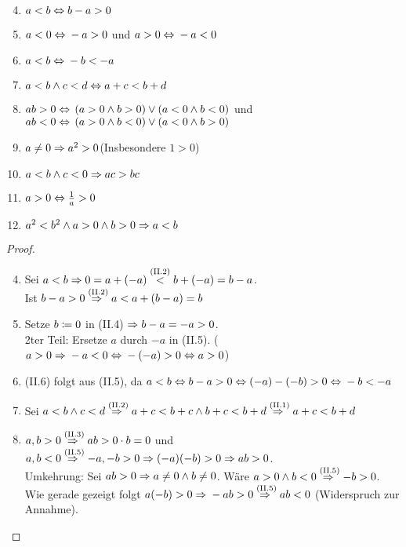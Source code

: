 
\begin{satz}
    \theoremescape
    \begin{enumerate}[label=(II.\arabic*)]
        \setcounter{enumi}{3}
        \item $a<b\equivalent b-a > 0$
        \item $a<0\equivalent -a > 0$ und $a>0\equivalent -a < 0$
        \item $a<b\equivalent -b < -a$
        \item $a<b \land c < d \equivalent a+c<b+d$
        \item $ab > 0 \equivalent \pair{a>0 \land b > 0}\lor\pair{a < 0 \land b < 0}$ und $ab < 0 \equivalent \pair{a>0 \land b < 0}\lor\pair{a < 0 \land b > 0}$
        \item $a\neq 0 \impl a^2 > 0$\quad(Insbesondere $1>0$)
        \item $a<b \land c<0 \impl ac > bc$
        \item $a>0 \equivalent \frac{1}{a}>0$
        \item $a^2 < b^2 \land a > 0 \land b > 0 \impl a < b$
    \end{enumerate}
    \newpage
    \begin{proof}
        \theoremescape
        \begin{enumerate}[label=(II.\arabic*)]
            \setcounter{enumi}{3}
            \item Sei $a<b \impl 0=a+(-a) \annot{<}{(II.2)} b + (-a) = b-a$.\\
            Ist $b-a>0 \annot{\impl}{(II.2)} a<a+(b-a)=b$
            \item Setze $b\definedas 0$ in (II.4) $\impl b-a=-a>0$.\\
            2ter Teil: Ersetze $a$ durch $-a$ in (II.5). ($a>0 \impl -a < 0 \equivalent -(-a)>0 \equivalent a >0$)
            \item (II.6) folgt aus (II.5), da $a<b\equivalent b-a>0 \equivalent (-a)-(-b) > 0\equivalent -b < -a$
            \item Sei $a<b \land c < d \annot{\impl}{(II.2)} a + c < b + c \land b + c < b + d \annot{\impl}{(II.1)} a+c < b + d$
            \item $a,b>0 \annot{\impl}{(II.3)} ab > 0\cdot b = 0$ und $a,b<0 \annot{\impl}{(II.5)} -a,-b>0 \impl (-a)(-b) > 0 \impl ab > 0$.\\
            Umkehrung: Sei $ab>0 \impl a\neq 0 \land b \neq 0$. Wäre $a>0 \land b < 0 \annot{\impl}{(II.5)} -b>0$. Wie gerade gezeigt folgt $a(-b) > 0 \impl -ab > 0 \annot{\impl}{(II.5)} ab < 0$ (Widerspruch zur Annahme).\\

\end{enumerate}
\end{proof}
\end{satz}
